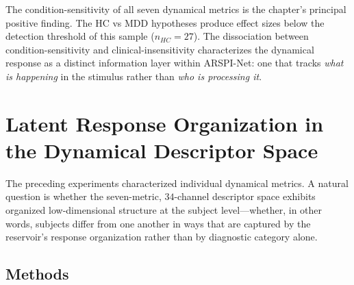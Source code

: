 The condition-sensitivity of all seven dynamical metrics is the chapter's principal positive finding. The HC vs MDD hypotheses produce effect sizes below the detection threshold of this sample ($n_{HC} = 27$). The dissociation between condition-sensitivity and clinical-insensitivity characterizes the dynamical response as a distinct information layer within ARSPI-Net: one that tracks \emph{what is happening} in the stimulus rather than \emph{who is processing it}.


\section{Latent Response Organization in the Dynamical Descriptor Space}
\label{sec:ch6_latent_axis}

The preceding experiments characterized individual dynamical metrics. A natural question is whether the seven-metric, $34$-channel descriptor space exhibits organized low-dimensional structure at the subject level---whether, in other words, subjects differ from one another in ways that are captured by the reservoir's response organization rather than by diagnostic category alone.

\subsection{Methods}

